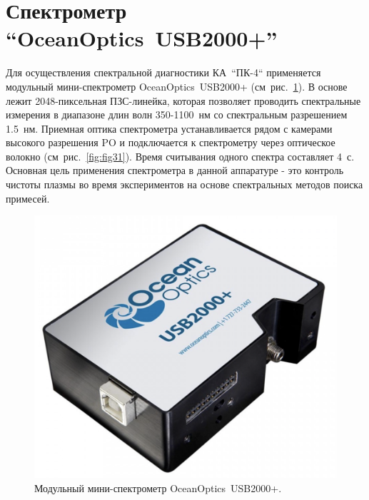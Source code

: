 \section{Спектрометр “OceanOptics~USB2000+”}
Для осуществления спектральной диагностики КА~“ПК-4“ применяется модульный мини-спектрометр OceanOptics~USB2000+ (см~рис.~\ref{fig:usb2000+}).
В основе лежит 2048-пиксельная ПЗС-линейка, которая позволяет проводить спектральные измерения в диапазоне длин
волн 350-1100~нм со спектральным разрешением 1.5~нм. Приемная оптика спектрометра устанавливается рядом
с камерами высокого разрешения PO и подключается к спектрометру через оптическое волокно (см~рис.~\ref{fig:fig31}).
Время считывания одного спектра составляет 4~с. Основная цель применения спектрометра в данной аппаратуре - это
контроль чистоты плазмы во время экспериментов на основе спектральных методов поиска примесей.
\begin{figure}[t]
  \centering
  \includegraphics[width=12cm]{figures/usb2000+}
  \caption{Модульный мини-спектрометр OceanOptics~USB2000+.}
  \label{fig:usb2000+}
\end{figure}

